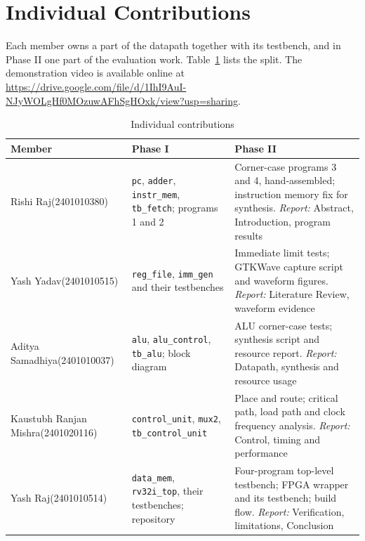 \documentclass[conference]{IEEEtran}
\begin{document}
\section{Individual Contributions}
Each member owns a part of the datapath together with its testbench, and in
Phase II one part of the evaluation work. Table~\ref{tab:contrib} lists the
split. The demonstration video is available online at
\url{https://drive.google.com/file/d/1IhI9AuI-NJyWOLgHf0MOzuwAFhSgHOxk/view?usp=sharing}.

\begin{table}[!htb]
\caption{Individual contributions}
\label{tab:contrib}
\centering
\setlength{\tabcolsep}{3pt}
\begin{tabular}{@{}>{\raggedright\arraybackslash}p{1.9cm}>{\raggedright\arraybackslash}p{2.7cm}>{\raggedright\arraybackslash}p{3.6cm}@{}}
\toprule
Member & Phase I & Phase II \\
\midrule
Rishi Raj\newline(2401010380) &
  \texttt{pc}, \texttt{adder}, \texttt{instr\_mem}, \texttt{tb\_fetch}; programs 1 and 2 &
  Corner-case programs 3 and 4, hand-assembled; instruction memory fix for synthesis.
  \emph{Report:} Abstract, Introduction, program results \\
\addlinespace
Yash Yadav\newline(2401010515) &
  \texttt{reg\_file}, \texttt{imm\_gen} and their testbenches &
  Immediate limit tests; GTKWave capture script and waveform figures.
  \emph{Report:} Literature Review, waveform evidence \\
\addlinespace
Aditya Samadhiya\newline(2401010037) &
  \texttt{alu}, \texttt{alu\_control}, \texttt{tb\_alu}; block diagram &
  ALU corner-case tests; synthesis script and resource report.
  \emph{Report:} Datapath, synthesis and resource usage \\
\addlinespace
Kaustubh Ranjan Mishra\newline(2401020116) &
  \texttt{control\_unit}, \texttt{mux2}, \texttt{tb\_control\_unit} &
  Place and route; critical path, load path and clock frequency analysis.
  \emph{Report:} Control, timing and performance \\
\addlinespace
Yash Raj\newline(2401010514) &
  \texttt{data\_mem}, \texttt{rv32i\_top}, their testbenches; repository &
  Four-program top-level testbench; FPGA wrapper and its testbench; build flow.
  \emph{Report:} Verification, limitations, Conclusion \\
\bottomrule
\end{tabular}
\end{table}
\end{document}
